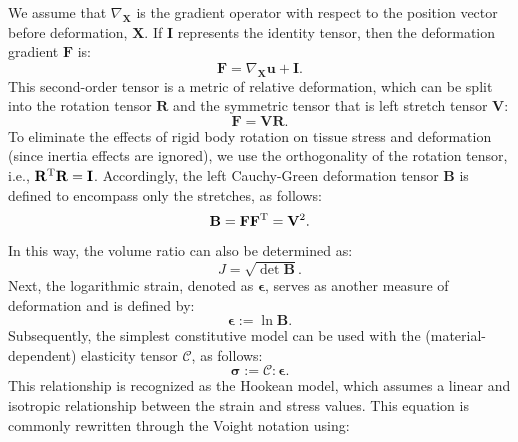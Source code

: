 We assume that $\nabla_\mathbf{X}$ is the gradient operator with respect to the position vector before deformation, $\mathbf{X}$. If $\mathbf{I}$ represents the identity tensor, then the deformation gradient $\mathbf{F}$ is:
%
\begin{equation}
    \mathbf{F} = \nabla_\mathbf{X} \mathbf{u} + \mathbf{I}.
\end{equation}
%
This second-order tensor is a metric of relative deformation, which can be split into the rotation tensor $\mathbf{R}$ and the symmetric tensor that is left stretch tensor $\mathbf{V}$:
%
\begin{equation}
    \mathbf{F} = \mathbf{V} \mathbf{R}. \label{eq1-1}
\end{equation}
%
To eliminate the effects of rigid body rotation on tissue stress and deformation (since inertia effects are ignored), we use the orthogonality of the rotation tensor, i.e., $\mathbf{R}^{\rm T}\mathbf{R} = \mathbf{I}$. Accordingly, the left Cauchy-Green deformation tensor $\mathbf{B}$ is defined to encompass only the stretches, as follows:
%
\begin{equation}
\mathbf{B} = \mathbf{F} \mathbf{F}^{\rm T} = \mathbf{V}^2.
\end{equation}
%
In this way, the volume ratio can also be determined as:
%
\begin{equation}
J = \sqrt{\det \mathbf{B}}.
\end{equation}
%
Next, the logarithmic strain, denoted as $\bm{\epsilon}$, serves as another measure of deformation and is defined by:
%
\begin{equation}
\bm{\epsilon} := \ln \mathbf{B}.
\end{equation}
%
Subsequently, the simplest constitutive model can be used with the (material-dependent) elasticity tensor $\mathcal{C}$, as follows:
%
\begin{equation}\label{eq-isotropic_elastic}
\bm{\sigma} := \mathcal{C} : \bm{\epsilon}.
\end{equation}
%
This relationship is recognized as the Hookean model, which assumes a linear and isotropic relationship between the strain and stress values. This equation is commonly rewritten through the Voight notation using:
%
